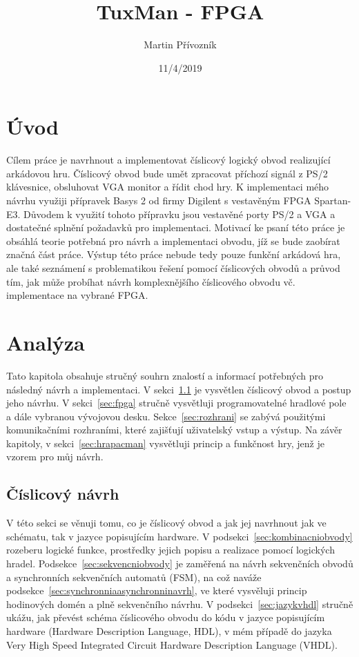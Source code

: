 \documentclass{report}
\title{TuxMan - FPGA}
\date{11/4/2019}
\author{Martin Přívozník}
\begin{document}
  
  \newpage

 

\newpage
\tableofcontents
\listoffigures
\listoftables

\newpage
{}

\chapter*{Úvod}
Cílem práce je navrhnout a implementovat číslicový logický obvod realizující arkádovou hru. Číslicový obvod bude umět zpracovat příchozí signál z PS/2 klávesnice, obsluhovat VGA monitor a řídit chod hry. K implementaci mého návrhu využiji přípravek Basys 2 od firmy Digilent s vestavěným FPGA Spartan-E3. Důvodem k využití tohoto přípravku jsou vestavěné porty PS/2 a VGA a dostatečné splnění požadavků pro implementaci. Motivací ke psaní této práce je obsáhlá teorie potřebná pro návrh a implementaci obvodu, jíž se bude zaobírat značná část práce. Výstup této práce nebude tedy pouze funkční arkádová hra, ale také seznámení s problematikou řešení pomocí číslicových obvodů a průvod tím, jak může probíhat návrh komplexnějšího číslicového obvodu vč. implementace na vybrané FPGA.

\chapter{Analýza}
Tato kapitola obsahuje stručný souhrn znalostí a informací potřebných pro následný návrh a implementaci. V sekci~\ref{sec:cislicovynavrh} je vysvětlen číslicový obvod a postup jeho návrhu. V sekci~\ref{sec:fpga} stručně vysvětluji programovatelné hradlové pole a dále vybranou vývojovou desku. Sekce~\ref{sec:rozhrani} se zabývá použitými komunikačními rozhraními, které zajišťují uživatelský vstup a výstup. Na závěr kapitoly, v sekci~\ref{sec:hrapacman} vysvětluji princip a funkčnost hry, jenž je vzorem pro můj návrh.

\section{Číslicový návrh}\label{sec:cislicovynavrh}
V této sekci se věnuji tomu, co je číslicový obvod a jak jej navrhnout jak ve schématu, tak v jazyce popisujícím hardware. V podsekci~\ref{sec:kombinacniobvody} rozeberu logické funkce, prostředky jejich popisu a realizace pomocí logických hradel. Podsekce~\ref{sec:sekvencniobvody}  je zaměřená na návrh sekvenčních obvodů a synchronních sekvenčních automatů (FSM), na což naváže podsekce~\ref{sec:synchronniaasynchronninavrh}, ve které vysvěluji princip hodinových domén a plně sekvenčního návrhu. V podsekci~\ref{sec:jazykvhdl} stručně ukážu, jak převést schéma číslicového obvodu do kódu v jazyce popisujícím hardware (Hardware Description Language, HDL), v mém případě do jazyka Very High Speed Integrated Circuit Hardware Description Language (VHDL).
\end{document}
